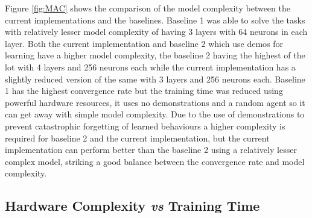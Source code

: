 Figure \ref{fig:MAC} shows the comparison of the model complexity between the current implementations and the baselines. Baseline 1 was able to solve the tasks with relatively lesser model complexity of having 3 layers with 64 neurons in each layer. Both the current implementation and baseline 2 which use demos for learning have a higher model complexity, the baseline 2 having the highest of the lot with 4 layers and 256 neurons each while the current implementation has a slightly reduced version of the same with 3 layers and 256 neurons each. Baseline 1 has the highest convergence rate but the training time was reduced using powerful hardware resources, it uses no demonstrations and a random agent so it can get away with simple model complexity. Due to the use of demonstrations to prevent catastrophic forgetting of learned behaviours a higher complexity is required for baseline 2 and the current implementation, but the current implementation can perform better than the baseline 2 using a relatively lesser complex model, striking a good balance between the convergence rate and model complexity. \\

\subsection{Hardware Complexity \textit{vs} Training Time}

